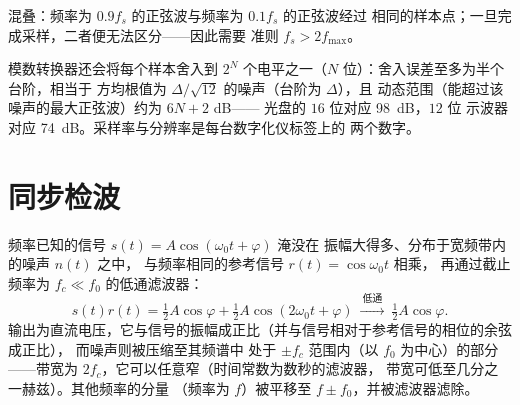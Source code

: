 \begin{omfigure}

{\small 混叠：频率为 $0.9f_s$ 的正弦波与频率为 $0.1f_s$ 的正弦波经过
相同的样本点；一旦完成采样，二者便无法区分——因此需要
准则 $f_s > 2f_{\max}$。}
\end{omfigure}

\begin{remark}[量化]\label{rem:b2:feedback-oscillators:quantization}
模数转换器还会将每个样本舍入到
$2^N$ 个电平之一（$N$ 位）：舍入误差至多为半个台阶，相当于
方均根值为 $\Delta/\sqrt{12}$ 的噪声（台阶为 $\Delta$），且
动态范围（能超过该噪声的最大正弦波）约为 $6N + 2$ dB——
光盘的 $16$ 位对应 \qty{98}{dB}，$12$ 位
示波器对应 \qty{74}{dB}。采样率与分辨率是每台数字化仪标签上的
两个数字。
\end{remark}

\section{同步检波}

\begin{proposition}[同步（锁相）检波]\label{prop:b2:feedback-oscillators:lockin}
频率已知的信号 $s(t) = A\cos(\omega_0t + \varphi)$ 淹没在
振幅大得多、分布于宽频带内的噪声 $n(t)$ 之中，
与频率相同的参考信号 $r(t) = \cos\omega_0t$ 相乘，
再通过截止频率为 $f_c \ll f_0$ 的低通滤波器：
\[
s(t)r(t) = \tfrac12A\cos\varphi + \tfrac12A\cos(2\omega_0t + \varphi)
\ \xrightarrow{\ \text{低通}\ }\ \tfrac12A\cos\varphi .
\]
输出为直流电压，它与信号的振幅成正比（并与信号相对于参考信号的相位的余弦成正比），
而噪声则被压缩至其频谱中
处于 $\pm f_c$ 范围内（以 $f_0$ 为中心）的部分
——带宽为 $2f_c$，它可以任意窄（时间常数为数秒的滤波器，
带宽可低至几分之一赫兹）。其他频率的分量
（频率为 $f$）被平移至 $f \pm f_0$，并被滤波器滤除。
\end{proposition}

